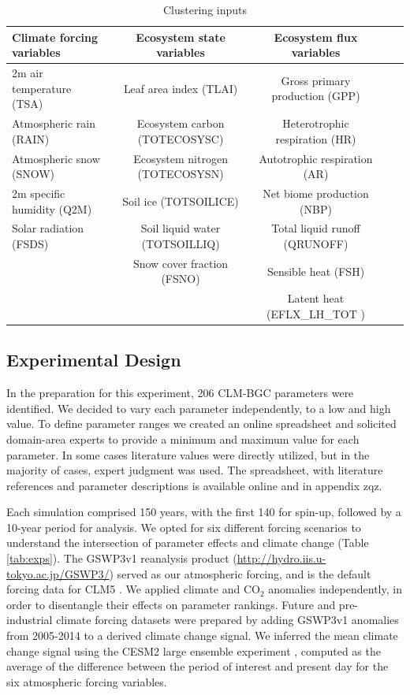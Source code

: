 \documentclass[draft]{agujournal2019}
\begin{document}
\begin{table}[h]
\caption{Clustering inputs}
\centering
\begin{tabular}{l c c c c}
 \hline
 Climate forcing variables & Ecosystem state variables &Ecosystem flux variables \\
 \hline
 2m air temperature (TSA) & Leaf area index (TLAI) & Gross primary production (GPP) \\
Atmospheric rain (RAIN) & Ecosystem carbon (TOTECOSYSC) &Heterotrophic respiration (HR) \\
Atmospheric snow (SNOW) &  Ecosystem nitrogen (TOTECOSYSN) &Autotrophic respiration (AR) \\
2m specific humidity (Q2M) & Soil ice (TOTSOILICE) &Net biome production (NBP) \\
Solar radiation (FSDS) & Soil liquid water (TOTSOILLIQ) & Total liquid runoff (QRUNOFF) \\
& Snow cover fraction (FSNO) & Sensible heat  (FSH) \\
&&Latent heat (EFLX\_LH\_TOT ) \\
 \hline
 \end{tabular}
 \label{tab:sg}
 \end{table}


\subsection{Experimental Design}
In the preparation for this experiment, 206 CLM-BGC parameters were identified. We decided to vary each parameter independently, to a low and high value. To define parameter ranges we created an online spreadsheet and solicited domain-area experts to provide a minimum and maximum value for each parameter. In some cases literature values were directly utilized, but in the majority of cases, expert judgment was used. The spreadsheet, with literature references and parameter descriptions is available online and in appendix zqz.

Each simulation comprised 150 years, with the first 140 for spin-up, followed by a 10-year period for analysis. We opted for six different forcing scenarios to understand the intersection of parameter effects and climate change (Table \ref{tab:exps}). The GSWP3v1 reanalysis product (\url{http://hydro.iis.u-tokyo.ac.jp/GSWP3/}) served as our atmospheric forcing, and is the default forcing data for CLM5 \cite{lawrence2019}. We applied climate and CO$_2$ anomalies independently, in order to disentangle their effects on parameter rankings. Future and pre-industrial climate forcing datasets were prepared by adding GSWP3v1 anomalies from 2005-2014 to a derived climate change signal. We inferred the mean climate change signal using the CESM2 large ensemble experiment \cite{rodgers2021}, computed as the average of the difference between the period of interest and present day for the six atmospheric forcing variables.
\end{document}
